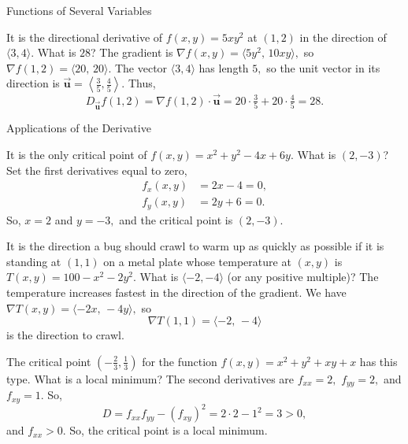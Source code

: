 \documentclass{article}
\newcommand{\bvec}[1]{\vec{\mathbf{#1}}}
\newcommand{\dotprod}{\cdot}
\begin{document}
\begin{category}{Functions of Several Variables}
  \begin{clue}[say]
    It is the directional derivative of $f(x,y)=5xy^2$ at $(1,2)$ in the direction of $\langle 3,4\rangle.$
  \response
    What is $28$?
  \solution
    The gradient is $\nabla f(x,y)=\langle 5y^2,\,10xy\rangle,$ so $\nabla f(1,2)=\langle 20,\,20\rangle.$ The vector $\langle 3,4\rangle$ has length $5,$ so the unit vector in its direction is $\bvec{u}=\left\langle\frac{3}{5},\frac{4}{5}\right\rangle.$ Thus,
    \[
    D_{\bvec{u}}f(1,2)=\nabla f(1,2)\dotprod\bvec{u}=20\cdot\tfrac{3}{5}+20\cdot\tfrac{4}{5}=28.
    \]
  \end{clue}

\end{category}

\begin{category}{Applications of the Derivative}

  \begin{clue}[say]
    It is the only critical point of $f(x,y)=x^2+y^2-4x+6y.$
  \response
    What is $(2,-3)$?
  \solution
    Set the first derivatives equal to zero,
    \begin{align*}
    f_x(x,y)&=2x-4=0, \\
    f_y(x,y)&=2y+6=0.
    \end{align*}
    So, $x=2$ and $y=-3,$ and the critical point is $(2,-3).$
  \end{clue}

  \begin{clue}[say]
    It is the direction a bug should crawl to warm up as quickly as possible if it is standing at $(1,1)$ on a metal plate whose temperature at $(x,y)$ is $T(x,y)=100-x^2-2y^2.$
  \response
    What is $\langle -2,-4\rangle$ (or any positive multiple)?
  \solution
    The temperature increases fastest in the direction of the gradient. We have $\nabla T(x,y)=\langle -2x,\,-4y\rangle,$ so
    \[
    \nabla T(1,1)=\langle -2,\,-4\rangle
    \]
    is the direction to crawl.
  \end{clue}

  \begin{clue}[say]
    The critical point $\left(-\frac{2}{3},\frac{1}{3}\right)$ for the function $f(x,y) = x^2 + y^2 + xy + x$ has this type.
  \response
    What is a local minimum?
  \solution
    The second derivatives are $f_{xx}=2,$ $f_{yy}=2,$ and $f_{xy}=1.$
    So,
    \[
    D=f_{xx}f_{yy}-(f_{xy})^2=2\cdot 2-1^2=3>0,
    \]
    and $f_{xx}>0.$ So, the critical point is a local minimum.
  \end{clue}


\end{category}
\end{document}
